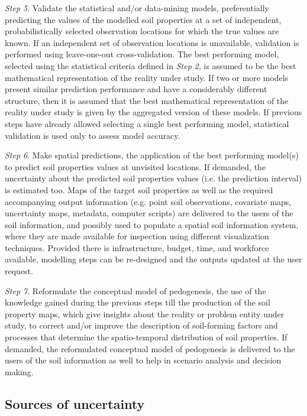 \noindent\textit{Step 5}. Validate the statistical and/or data-mining models, preferentially
predicting the values of the modelled soil properties at a set of independent, probabilistically
selected observation locations for which the true values are known. If an independent set of
observation locations is unavailable, validation is performed using leave-one-out cross-validation.
The best performing model, selected using the statistical criteria defined in \textit{Step 2}, is
assumed to be the best mathematical representation of the reality under study. If two or more
models present similar prediction performance and have a considerably different structure, then it
is assumed that the best mathematical representation of the reality under study is given by the
aggregated version of these models. If previous steps have already allowed selecting a single best
performing model, statistical validation is used only to assess model accuracy.

\noindent\textit{Step 6}. Make spatial predictions, the application of the best performing
model(s) to predict soil properties values at unvisited locations. If demanded, the uncertainty
about the predicted soil properties values (i.e. the prediction interval) is estimated too.
Maps of the target soil properties as well as the required accompanying output information
(e.g. point soil observations, covariate maps, uncertainty maps, metadata, computer scripts)
are delivered to the users of the soil information, and possibly used to populate a spatial soil
information system, where they are made available for inspection using different visualization
techniques. Provided there is infrastructure, budget, time, and workforce available, modelling
steps can be re-designed and the outputs updated at the user request.

\noindent\textit{Step 7}. Reformulate the conceptual model of pedogenesis, the use
of the knowledge gained during the previous steps till the production of the soil property
maps, which give insights about the reality or problem entity under study, to correct
and/or improve the description of soil-forming factors and processes that determine the
spatio-temporal distribution of soil properties. If demanded, the reformulated conceptual model
of pedogenesis is delivered to the users of the soil information as well to help in scenario analysis
and decision making.

\subsection{Sources of uncertainty}
\label{sec:intro-uncertainty}


